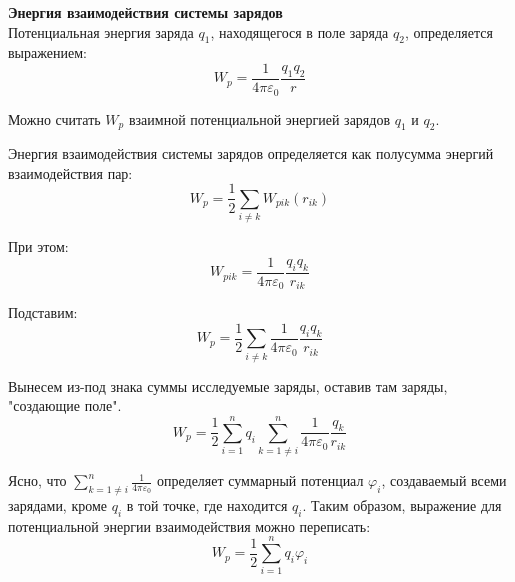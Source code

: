 \documentclass{article}
\begin{document}
	\textbf{Энергия взаимодействия системы зарядов}\\
	
	Потенциальная энергия заряда $q_1$, находящегося в поле заряда $q_2$, определяется выражением:
	\begin{equation}
		W_p = \frac{1}{4\pi\varepsilon_0}\frac{q_1q_2}{r}
	\end{equation}

	Можно считать $W_p$ взаимной потенциальной энергией зарядов $q_1$ и $q_2$. 

	Энергия взаимодействия системы зарядов определяется как полусумма энергий взаимодействия пар:
	\begin{equation}
		W_{p} = \frac{1}{2}\sum_{i\neq k}W_{pik}(r_{ik})
	\end{equation}

	При этом:
	\begin{equation}
		W_{pik} = \frac{1}{4\pi\varepsilon_0}\frac{q_iq_k}{r_{ik}}
	\end{equation}

	Подставим:
	\begin{equation}
		W_p = \frac{1}{2}\sum_{i\neq k}\frac{1}{4\pi\varepsilon_0}\frac{q_iq_k}{r_{ik}}
	\end{equation}

	Вынесем из-под знака суммы исследуемые заряды, оставив там заряды, "создающие поле".
	\begin{equation}
		W_p = \frac{1}{2}\sum_{i=1}^nq_i\sum_{k=1\neq i}^n\frac{1}{4\pi\varepsilon_0}\frac{q_k}{r_{ik}}
	\end{equation}

	Ясно, что $\sum_{k=1\neq i}^n\frac{1}{4\pi\varepsilon_0}$ определяет суммарный потенциал $\varphi_i$, создаваемый всеми зарядами, кроме $q_i$ в той точке, где находится $q_i$. Таким образом, выражение для потенциальной энергии взаимодействия можно переписать:
	\begin{equation}
		W_p = \frac{1}{2}\sum_{i=1}^n q_i\varphi_i
	\end{equation}
\end{document}
